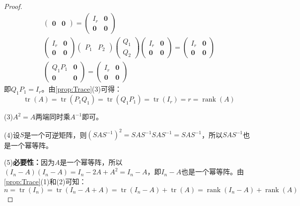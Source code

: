 \begin{proof}
\begin{gather*}
\begin{pmatrix}
			\mathbf{0} & \mathbf{0}
		\end{pmatrix}=
		\begin{pmatrix}
			I_r & \mathbf{0} \\
			\mathbf{0} & \mathbf{0}
		\end{pmatrix} \\
		\begin{pmatrix}
			I_r & \mathbf{0} \\
			\mathbf{0} & \mathbf{0}
		\end{pmatrix}
		\begin{pmatrix}
			P_1 & P_2
		\end{pmatrix}
		\begin{pmatrix}
			Q_1 \\
			Q_2
		\end{pmatrix}
		\begin{pmatrix}
			I_r & \mathbf{0} \\
			\mathbf{0} & \mathbf{0}
		\end{pmatrix}=
		\begin{pmatrix}
			I_r & \mathbf{0} \\
			\mathbf{0} & \mathbf{0}
		\end{pmatrix} \\
		\begin{pmatrix}
			Q_1P_1 & \mathbf{0} \\
			\mathbf{0} & \mathbf{0}
		\end{pmatrix}
		=
		\begin{pmatrix}
			I_r & \mathbf{0} \\
			\mathbf{0} & \mathbf{0}
		\end{pmatrix}
	\end{gather*}
	即$Q_1P_1=I_r$。由\cref{prop:Trace}(3)可得：
	\begin{equation*}
		\operatorname{tr}(A)=\operatorname{tr}(P_1Q_1)=\operatorname{tr}(Q_1P_1)=\operatorname{tr}(I_r)=r=\operatorname{rank}(A)
	\end{equation*}\par
	(3)$A^2=A$两端同时乘$A^{-1}$即可。\par
	(4)设$S$是一个可逆矩阵，则$(SAS^{-1})^2=SAS^{-1}SAS^{-1}=SAS^{-1}$，所以$SAS^{-1}$也是一个幂等阵。\par
	(5)\textbf{必要性：}因为$A$是一个幂等阵，所以$(I_n-A)(I_n-A)=I_n-2A+A^2=I_n-A$，即$I_n-A$也是一个幂等阵。由\cref{prop:Trace}(1)和(2)可知：
	\begin{equation*}
		n=\operatorname{tr}(I_n)=\operatorname{tr}(I_n-A+A)=\operatorname{tr}(I_n-A)+\operatorname{tr}(A)=\operatorname{rank}(I_n-A)+\operatorname{rank}(A)

\end{equation*}
\end{proof}
